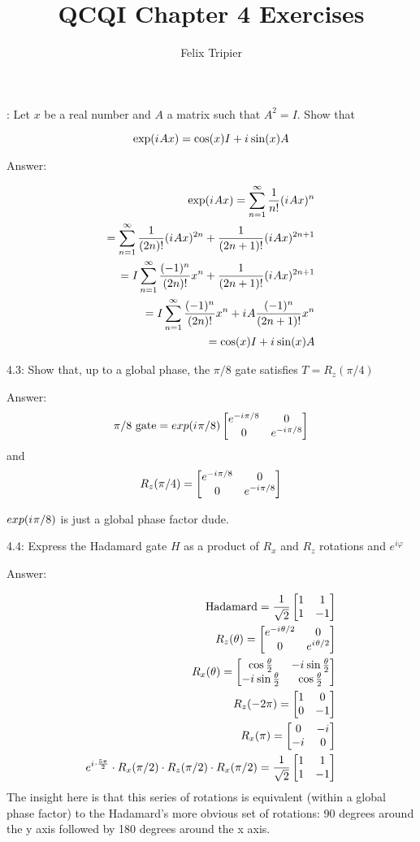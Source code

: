 \documentclass[12pt, letterpaper, twoside]{article}
\title{QCQI Chapter 4 Exercises}
\author{Felix Tripier}
\newcommand{\iu}{{i\mkern1mu}}
\newcommand{\Hadamard}{\frac{1}{\sqrt{2}}
\begin{bmatrix}
    1 & 1 \\
    1 & -1
\end{bmatrix}}
\newcommand{\Rz}{\begin{bmatrix}
        e^{-\iu\theta/2} & 0 \\
        0 & e^{\iu\theta/2}
    \end{bmatrix}}
\newcommand{\halftheta}{\frac{\theta}{2}}
\newcommand{\Rx}{\begin{bmatrix}
    \cos{\halftheta} & -\iu\sin{\halftheta} \\
    -\iu\sin{\halftheta} & \cos{\halftheta}
\end{bmatrix}}
\newcommand{\twoXtwo}[4]{\begin{bmatrix}
    #1 & #3 \\
    #2 & #4
\end{bmatrix}}
\begin{document}
: Let $x$ be a real number and $A$ a matrix such that $A^2 = I$. Show that

$$
	\exp(\iu Ax) = \cos(x)I + \iu \sin(x)A
$$

Answer:

\begin{subequations}
	\begin{align}
		\exp(\iu Ax) = \sum_{n=1}^{\infty} \frac{1}{n!} (\iu Ax)^n                                \\
		= \sum_{n=1}^{\infty} \frac{1}{(2n)!} (\iu Ax)^{2n} + \frac{1}{(2n + 1)!} (\iu Ax)^{2n+1} \\
		= I\sum_{n=1}^{\infty} \frac{(-1)^n}{(2n)!} x^{n} + \frac{1}{(2n + 1)!} (\iu Ax)^{2n+1}   \\
		= I\sum_{n=1}^{\infty} \frac{(-1)^n}{(2n)!} x^{n} + \iu A\frac{(-1)^n}{(2n + 1)!} x^n     \\
		= \cos(x)I + \iu \sin(x)A
	\end{align}
\end{subequations}

4.3: Show that, up to a global phase, the $\pi/8$ gate satisfies $T = R_z(\pi/4)$

Answer:
\[
	\pi/8 \text{ gate} =
	exp(\iu\pi/8)
	\begin{bmatrix}
		e^{-\iu \pi/8} & 0              \\
		0              & e^{-\iu \pi/8}
	\end{bmatrix}
\]
and
\[
	R_z(\pi/4) =
	\begin{bmatrix}
		e^{-\iu \pi/8} & 0              \\
		0              & e^{-\iu \pi/8}
	\end{bmatrix}
\]

$exp(\iu\pi/8)$ is just a global phase factor dude.


4.4: Express the Hadamard gate $H$ as a product of $R_x$ and $R_z$ rotations and $e^{i\varphi}$

Answer:

\begin{subequations}
	\begin{align}
		\text{Hadamard} = \Hadamard           \\
		R_z(\theta) = \Rz                     \\
		R_x(\theta) = \Rx                     \\
		R_z(-2\pi) = \twoXtwo{1}{0}{0}{-1}    \\
		R_x(\pi) = \twoXtwo{0}{-\iu}{-\iu}{0} \\
		e^{\iu\cdot\frac{5\pi}{2}} \cdot R_x(\pi/2) \cdot R_z(\pi/2) \cdot R_x(\pi/2) = \Hadamard
	\end{align}
\end{subequations}
The insight here is that this series of rotations is equivalent (within a global phase factor) to the Hadamard's more obvious set of rotations: 90 degrees around the y axis followed by 180 degrees around the x axis.
\end{document}

